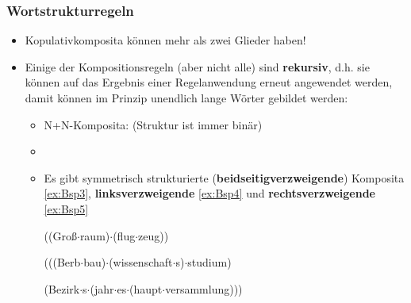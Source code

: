 \begin{frame}
\frametitle{Wortstrukturregeln}

\begin{itemize}
	\item Kopulativkomposita können mehr als zwei Glieder haben!
	\item Einige der Kompositionsregeln (aber nicht alle) sind \textbf{rekursiv}, d.h. sie können auf das Ergebnis einer Regelanwendung erneut angewendet werden, damit können im Prinzip unendlich lange Wörter gebildet werden:
	
	\begin{itemize}
		\item N+N-Komposita: (Struktur ist immer binär)
		\item[]
		\item Es gibt symmetrisch strukturierte (\textbf{beidseitigverzweigende}) Komposita \ref{ex:Bsp3}, \textbf{linksverzweigende} \ref{ex:Bsp4} und \textbf{rechtsverzweigende} \ref{ex:Bsp5}
		
		\ea \label{ex:Bsp3} ((Groß$\cdot$raum)$\cdot$(flug$\cdot$zeug))
		\z
		
		\ea \label{ex:Bsp4} (((Berb$\cdot$bau)$\cdot$(wissenschaft$\cdot$s)$\cdot$studium)
		\z
		
		\ea \label{ex:Bsp5} (Bezirk$\cdot$s$\cdot$(jahr$\cdot$es$\cdot$(haupt$\cdot$versammlung)))
		\z
		
	\end{itemize}
\end{itemize}


\end{frame}


